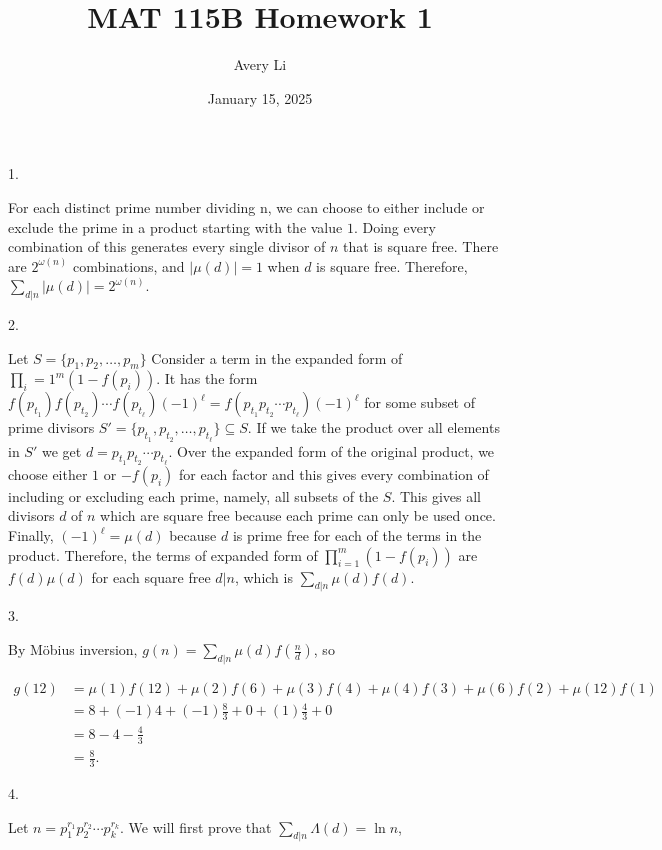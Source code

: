 \documentclass[11pt]{article}
\title{MAT 115B Homework 1}
\author{Avery Li}
\date{January 15, 2025}
\begin{document}
\maketitle


\begin{flushleft}
1.
\end{flushleft}
For each distinct prime number dividing n, we can choose to either include or exclude the prime in a product starting with the value $1$.
Doing every combination of this generates every single divisor of $n$ that is square free. There are $2^{\omega(n)}$ combinations,
and $|\mu(d)|=1$ when $d$ is square free. Therefore, $\sum_{d\vert n}|\mu(d)|=2^{\omega(n)}$.


\begin{flushleft}
2.
\end{flushleft}
Let $S=\{p_1,p_2,\dots,p_m\}$
Consider a term in the expanded form of $\prod_i=1^m (1-f(p_i))$. It has the form $f(p_{t_1})f(p_{t_2})\cdots f(p_{t_\ell})(-1)^{\ell}=f(p_{t_1}p_{t_2}\cdots p_{t_\ell})(-1)^\ell$
for some subset of prime divisors $S'=\{p_{t_1},p_{t_2},\dots,p_{t_\ell}\}\subseteq S$. If we take the product over all elements in $S'$
we get $d=p_{t_1}p_{t_2}\cdots p_{t_\ell}$. Over the expanded form of the original product, we choose either $1$ or $-f(p_i)$ for each factor
and this gives every combination of including or excluding each prime, namely, all subsets of the $S$. This gives all divisors $d$ of $n$
which are square free because each prime can only be used once. Finally, $(-1)^\ell=\mu(d)$ because $d$ is prime free for each of the terms
in the product. Therefore, the terms of expanded form of $\prod_{i=1}^m (1-f(p_i))$ are $f(d)\mu(d)$ for each square free $d\vert n$, which is $\sum_{d\vert n}\mu(d)f(d)$.

\begin{flushleft}
3.
\end{flushleft}
By M\"obius inversion, $g(n)=\sum_{d\vert n}\mu(d)f\left(\frac{n}{d}\right)$, so

\begin{align*}
    g(12)&=\mu(1)f(12)+\mu(2)f(6)+\mu(3)f(4)+\mu(4)f(3)+\mu(6)f(2)+\mu(12)f(1)\\
    &= 8+(-1)4+(-1)\frac{8}{3}+0+(1)\frac{4}{3}+0\\
    &=8-4-\frac{4}{3}\\
    &=\frac{8}{3}.
\end{align*}

\begin{flushleft}
4.
\end{flushleft}
Let $n=p_1^{r_1}p_2^{r_2}\cdots p_k^{r_k}$.
We will first prove that $\sum_{d\vert n}\Lambda(d)=\ln n$,
\end{document}
